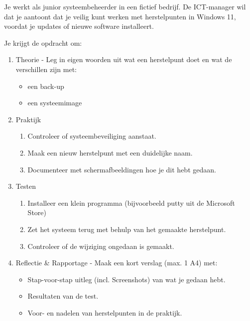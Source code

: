 Je werkt als junior systeembeheerder in een fictief bedrijf. De ICT-manager wil dat je aantoont dat je veilig kunt werken met herstelpunten in Windows 11, voordat je updates of nieuwe software installeert.

Je krijgt de opdracht om:
\begin{enumerate}
\item Theorie - Leg in eigen woorden uit wat een herstelpunt doet en wat de verschillen zijn met:
  \begin{itemize}
  \item een back-up
  \item een systeemimage
  \end{itemize}
\item Praktijk
  \begin{enumerate}
  \item Controleer of systeembeveiliging aanstaat.
  \item Maak een nieuw herstelpunt met een duidelijke naam.
  \item Documenteer met schermafbeeldingen hoe je dit hebt gedaan.
  \end{enumerate}
\item Testen
  \begin{enumerate}
  \item Installeer een klein programma (bijvoorbeeld putty uit de Microsoft Store)
  \item Zet het systeem terug met behulp van het gemaakte herstelpunt.
  \item Controleer of de wijziging ongedaan is gemaakt.
  \end{enumerate}
\item Reflectie \& Rapportage - Maak een kort verslag (max. 1 A4) met:
  \begin{itemize}
  \item Stap-voor-stap uitleg (incl. Screenshots) van wat je gedaan hebt.
  \item Resultaten van de test.
  \item Voor- en nadelen van herstelpunten in de praktijk.
  \end{itemize}
\end{enumerate}

